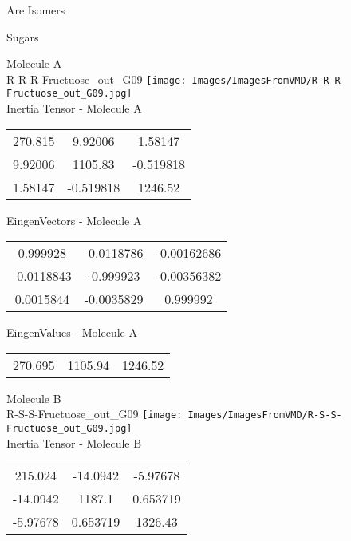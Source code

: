 \begin{center}
\vtab
\vtab
\textcolor{NavyBlue}{\Large Are Isomers}
\end{center}
\newpage

\vtab[-2cm]
\begin{center}
{\large Sugars}
\end{center}
\begin{multicols}{2}
\begin{center}
Molecule A \\ 
R-R-R-Fructuose\_out\_G09
\texttt{[image: Images/ImagesFromVMD/R-R-R-Fructuose\_out\_G09.jpg]}
\\
Inertia Tensor - Molecule A \\
\vtab
\begin{tabular}{|c c c|}
270.815	 & 	9.92006	 & 	1.58147	 \\
9.92006	 & 	1105.83	 & 	-0.519818	 \\
1.58147	 & 	-0.519818	 & 	1246.52
\end{tabular}

\vtab
 EingenVectors - Molecule A     \\
\vtab
\begin{tabular}{|c c c|}
0.999928	 & 	-0.0118786	 & 	-0.00162686	 \\
-0.0118843	 & 	-0.999923	 & 	-0.00356382	 \\
0.0015844	 & 	-0.0035829	 & 	0.999992
\end{tabular}

\vtab
 EingenValues - Molecule A     \\
\vtab
\begin{tabular}{|c c c|}
270.695	 & 	1105.94	 & 	1246.52
\end{tabular}
\columnbreak

Molecule B \\ 
R-S-S-Fructuose\_out\_G09
\texttt{[image: Images/ImagesFromVMD/R-S-S-Fructuose\_out\_G09.jpg]}
\\
Inertia Tensor - Molecule B \\
\vtab
\begin{tabular}{|c c c|}
215.024	 & 	-14.0942	 & 	-5.97678	 \\
-14.0942	 & 	1187.1	 & 	0.653719	 \\
-5.97678	 & 	0.653719	 & 	1326.43
\end{tabular}


\end{center}
\end{multicols}
